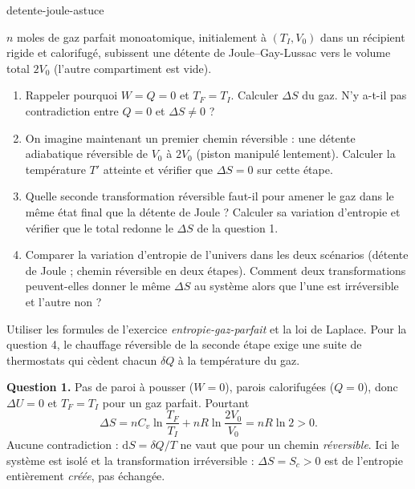 \begin{exo}{detente-joule-astuce}

$n$ moles de gaz parfait monoatomique, initialement à $(T_I, V_0)$ dans un récipient rigide et calorifugé, subissent une détente de Joule--Gay-Lussac vers le volume total $2V_0$ (l'autre compartiment est vide).

\begin{enumerate}
\item Rappeler pourquoi $W = Q = 0$ et $T_F = T_I$. Calculer $\Delta S$ du gaz. N'y a-t-il pas contradiction entre $Q = 0$ et $\Delta S \neq 0$ ?
\item On imagine maintenant un premier chemin réversible : une détente adiabatique réversible de $V_0$ à $2V_0$ (piston manipulé lentement). Calculer la température $T'$ atteinte et vérifier que $\Delta S = 0$ sur cette étape.
\item Quelle seconde transformation réversible faut-il pour amener le gaz dans le même état final que la détente de Joule ? Calculer sa variation d'entropie et vérifier que le total redonne le $\Delta S$ de la question 1.
\item Comparer la variation d'entropie de l'univers dans les deux scénarios (détente de Joule ; chemin réversible en deux étapes). Comment deux transformations peuvent-elles donner le même $\Delta S$ au système alors que l'une est irréversible et l'autre non ?
\end{enumerate}

\begin{indication}
Utiliser les formules de l'exercice \textit{entropie-gaz-parfait} et la loi de Laplace. Pour la question 4, le chauffage réversible de la seconde étape exige une suite de thermostats qui cèdent chacun $\delta Q$ à la température du gaz.
\end{indication}

\begin{solution}
\textbf{Question 1.} Pas de paroi à pousser ($W=0$), parois calorifugées ($Q=0$), donc $\Delta U = 0$ et $T_F = T_I$ pour un gaz parfait. Pourtant
\[
\Delta S = nC_v\ln\frac{T_F}{T_I} + nR\ln\frac{2V_0}{V_0} = nR\ln 2 > 0.
\]
Aucune contradiction : $\mathrm{d}S = \delta Q/T$ ne vaut que pour un chemin \emph{réversible}. Ici le système est isolé et la transformation irréversible : $\Delta S = S_c > 0$ est de l'entropie entièrement \emph{créée}, pas échangée.


\end{solution}
\end{exo}
